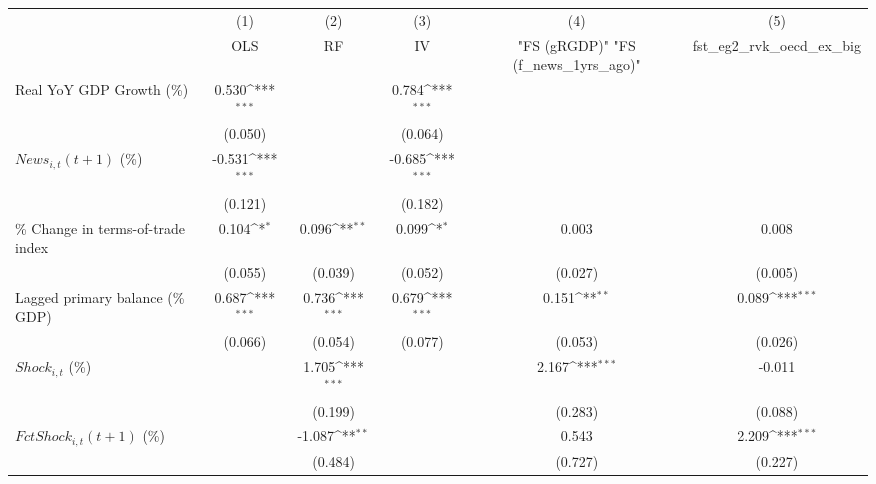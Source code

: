 {
\def\sym#1{\ifmmode^{#1}\else\(^{#1}\)\fi}
\begin{tabular}{l*{5}{c}}
\toprule
                    &\multicolumn{1}{c}{(1)}&\multicolumn{1}{c}{(2)}&\multicolumn{1}{c}{(3)}&\multicolumn{1}{c}{(4)}&\multicolumn{1}{c}{(5)}\\
                    &\multicolumn{1}{c}{OLS}&\multicolumn{1}{c}{RF}&\multicolumn{1}{c}{IV}&\multicolumn{1}{c}{ "FS (gRGDP)"  "FS (f_news_1yrs_ago)" }&\multicolumn{1}{c}{fst_eg2_rvk_oecd_ex_big}\\
\midrule
Real YoY GDP Growth (\%)&       0.530\sym{***}&                     &       0.784\sym{***}&                     &                     \\
                    &     (0.050)         &                     &     (0.064)         &                     &                     \\
\addlinespace
$ News_{i,t}(t+1)$ (\%)&      -0.531\sym{***}&                     &      -0.685\sym{***}&                     &                     \\
                    &     (0.121)         &                     &     (0.182)         &                     &                     \\
\addlinespace
\% Change in terms-of-trade index&       0.104\sym{*}  &       0.096\sym{**} &       0.099\sym{*}  &       0.003         &       0.008         \\
                    &     (0.055)         &     (0.039)         &     (0.052)         &     (0.027)         &     (0.005)         \\
\addlinespace
Lagged primary balance (\% GDP)&       0.687\sym{***}&       0.736\sym{***}&       0.679\sym{***}&       0.151\sym{**} &       0.089\sym{***}\\
                    &     (0.066)         &     (0.054)         &     (0.077)         &     (0.053)         &     (0.026)         \\
\addlinespace
$ Shock_{i,t}$ (\%) &                     &       1.705\sym{***}&                     &       2.167\sym{***}&      -0.011         \\
                    &                     &     (0.199)         &                     &     (0.283)         &     (0.088)         \\
\addlinespace
$ FctShock_{i,t}(t+1)$ (\%)&                     &      -1.087\sym{**} &                     &       0.543         &       2.209\sym{***}\\
                    &                     &     (0.484)         &                     &     (0.727)         &     (0.227)         \\

\end{tabular}}
